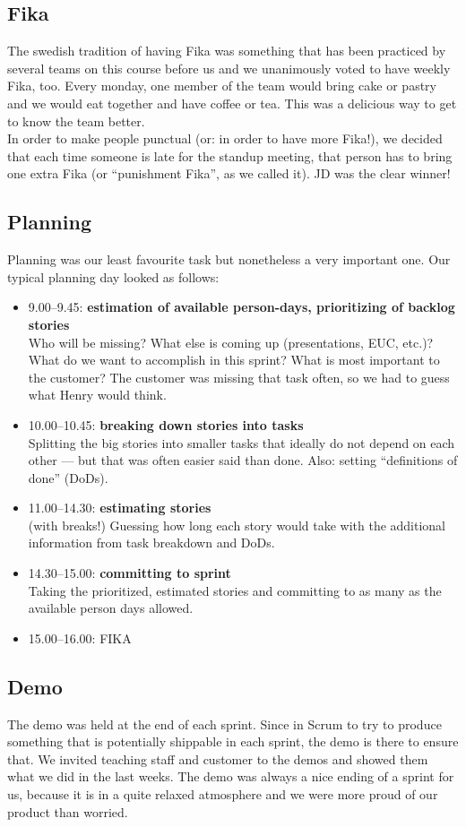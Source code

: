 \documentclass[11pt,a4paper]{report}
\begin{document}
\subsection{Fika}
The swedish tradition of having Fika was something that has been practiced by
several teams on this course before us and we unanimously voted to have weekly
Fika, too. Every monday, one member of the team would bring cake or pastry and
we would eat together and have coffee or tea. This was a delicious way to get to
know the team better. \\
In order to make people punctual (or: in order to have more Fika!), we decided
that each time someone is late for the standup meeting, that person has to
bring one extra Fika (or ``punishment Fika'', as we called it).
JD was the clear winner!
\subsection{Planning}
Planning was our least favourite task but nonetheless a very important one.
Our typical planning day looked as follows:
\begin{itemize}
\item 9.00--9.45: {\bf estimation of available person-days,
  prioritizing of backlog stories}\\
  Who will be missing? What else is coming up (presentations, EUC, etc.)?
  What do we want to accomplish in this sprint?
  What is most important to the customer? The customer was missing that task
  often, so we had to guess what Henry would think.
\item 10.00--10.45: {\bf breaking down stories into tasks}\\
  Splitting the big stories into smaller tasks that ideally do not depend on
  each other --- but that was often easier said than done.
  Also: setting ``definitions of done'' (DoDs).
\item 11.00--14.30: {\bf estimating stories}\\
  (with breaks!)
  Guessing how long each story would take with the additional information from
  task breakdown and DoDs.
\item 14.30--15.00: {\bf committing to sprint}\\
  Taking the prioritized, estimated stories and committing to as many as the
  available person days allowed.
\item 15.00--16.00: FIKA
\end{itemize}

\subsection{Demo}
The demo was held at the end of each sprint. Since in Scrum to try to produce
something that is potentially shippable in each sprint, the demo is there to
ensure that. We invited teaching staff and customer to the demos and showed them
what we did in the last weeks. The demo was always a nice ending of a sprint for
us, because it is in a quite relaxed atmosphere and we were more proud of our
product than worried.
\end{document}
